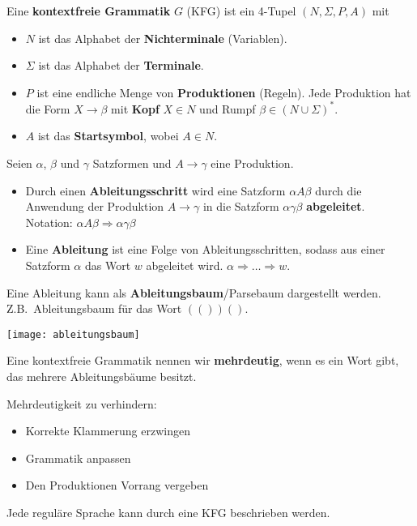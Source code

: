 
Eine \textbf{kontextfreie Grammatik} $G$ (KFG) ist ein 4-Tupel $(N, \Sigma, P, A)$ mit
\begin{itemize}
    \item $N$ ist das Alphabet der \textbf{Nichterminale} (Variablen).
    \item $\Sigma$ ist das Alphabet der \textbf{Terminale}.
    \item $P$ ist eine endliche Menge von \textbf{Produktionen} (Regeln).
    Jede Produktion hat die Form $X \rightarrow \beta$ mit \textbf{Kopf} $X \in N$ und Rumpf $\beta \in (N \cup \Sigma)^*$.
    \item $A$ ist das \textbf{Startsymbol}, wobei $A \in N$.
\end{itemize}

Seien $\alpha$, $\beta$ und $\gamma$ Satzformen und $A \rightarrow \gamma$ eine Produktion.
\begin{itemize}
    \item Durch einen \textbf{Ableitungsschritt} wird eine Satzform $\alpha A \beta$ durch die Anwendung der Produktion $A \rightarrow \gamma$ in die Satzform $\alpha \gamma \beta$ \textbf{abgeleitet}.
    Notation: $\alpha A \beta \Rightarrow \alpha \gamma \beta$
    \item Eine \textbf{Ableitung} ist eine Folge von Ableitungsschritten, sodass aus einer Satzform $\alpha$ das Wort $w$ abgeleitet wird. $\alpha \Rightarrow \dots \Rightarrow w$.
\end{itemize}

\columnbreak

Eine Ableitung kann als \textbf{Ableitungsbaum}/Parsebaum dargestellt werden.
Z.B.\ Ableitungsbaum für das Wort $(())()$.

\texttt{[image: ableitungsbaum]}

Eine kontextfreie Grammatik nennen wir \textbf{mehrdeutig}, wenn es ein Wort gibt, das mehrere Ableitungsbäume besitzt.

Mehrdeutigkeit zu verhindern:
\begin{itemize}
    \item Korrekte Klammerung erzwingen
    \item Grammatik anpassen
    \item Den Produktionen Vorrang vergeben
\end{itemize}

Jede reguläre Sprache kann durch eine KFG beschrieben werden.

